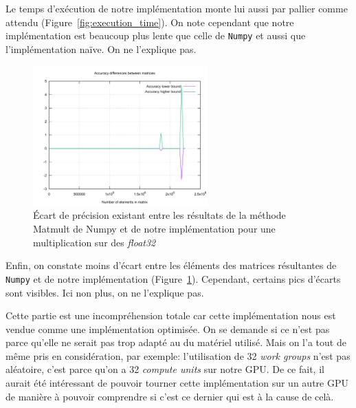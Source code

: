 Le temps d'exécution de notre implémentation monte lui aussi par pallier comme attendu
(Figure~\ref{fig:execution_time}). On note cependant que notre implémentation 
est beaucoup plus lente que celle de \texttt{Numpy} et aussi que l'implémentation naïve. 
On ne l'explique pas.

\begin{figure}[H]
\begin{center}
    \includegraphics[width=0.6\textwidth]{../../resources/float_accuracy.png}
    \caption{Écart de précision existant entre les résultats de la méthode Matmult de Numpy 
    et de notre implémentation pour une multiplication sur des \textit{float32}}
    \label{fig:accuracy}
\end{center}
\end{figure}

Enfin, on constate moins d'écart entre les éléments des matrices résultantes de \texttt{Numpy} et 
de notre implémentation (Figure~\ref{fig:accuracy}). Cependant, certains pics d'écarts sont visibles. 
Ici non plus, on ne l'explique pas.

Cette partie est une incompréhension totale car cette implémentation nous est vendue comme 
une implémentation optimisée. On se demande si ce n'est pas parce qu'elle ne serait pas 
trop adapté au du matériel utilisé. Mais on l'a tout de même pris en considération, par exemple: 
l'utilisation de 32 \textit{work groups} n'est pas aléatoire, c'est parce qu'on a 32 
\textit{compute units} sur notre GPU\@. De ce fait, il aurait été intéressant de pouvoir tourner cette 
implémentation sur un autre GPU de manière à pouvoir comprendre si c'est ce dernier qui 
est à la cause de celà.
